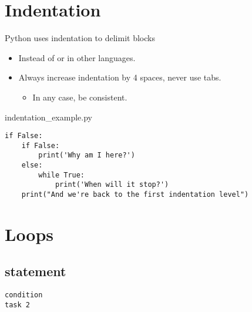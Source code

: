 \documentclass[aspectratio=1610,t]{beamer}
\begin{document}
\section{Indentation}
\begin{pframe}
 Python uses indentation to delimit blocks
 \begin{itemize}
   \item Instead of  or  in other languages.
   \item Always increase indentation by 4 spaces, never use tabs.
   \begin{itemize}
     \item In any case, be consistent.
   \end{itemize}
 \end{itemize}
 \begin{pythonfile}{indentation\_example.py}
  \begin{verbatim}
if False:
    if False:
        print('Why am I here?')
    else:
        while True:
            print('When will it stop?')
    print("And we're back to the first indentation level")
  \end{verbatim}
 \end{pythonfile}
\end{pframe}



\section{Loops}

\begin{pframe}
 \begin{center}
  
 \end{center}
\end{pframe}


\subsection{ statement}
\begin{pframe}
 \begin{minipage}{0.47\textwidth}
 \begin{center}
  
 \end{center}
 \end{minipage}%
 \begin{minipage}{0.47\textwidth}
  \begin{pythondeclaration}
   \textvisiblespace\lstinline{condition}\emp{:}\\
   \textvisiblespace\textvisiblespace\textvisiblespace\textvisiblespace
   \lstinline{task 2}
  \end{pythondeclaration}
 \end{minipage}
\end{pframe}
\end{document}
